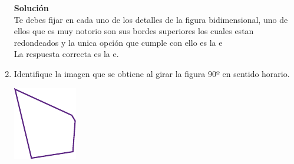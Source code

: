\documentclass[11pt, a4paper]{article} %
\theoremstyle{dotlessP}
\theoremstyle{dotlessS}
\begin{document}
\begin{enumerate}[label=\color{dg}\theenumi.]
         \begin{figure}[h!]
       \centering
       \qquad 
		\qquad 
        		\qquad 
\end{figure}
 \textbf{Solución}\\
 Te debes fijar en cada uno de los detalles de la figura bidimensional, uno de ellos que es muy notorio son sus bordes superiores los cuales estan redondeados y la unica opción que cumple con ello es la e\\
 {\color{dh} La respuesta correcta es la e.}
   \item {\color{db} Identifique la imagen que se obtiene al girar la figura 90º en sentido horario.
        }
         \begin{center}
    \includegraphics[scale=1]{Figuras/131_1.pdf}\\
    \end{center}
    

\end{enumerate}
\end{document}
